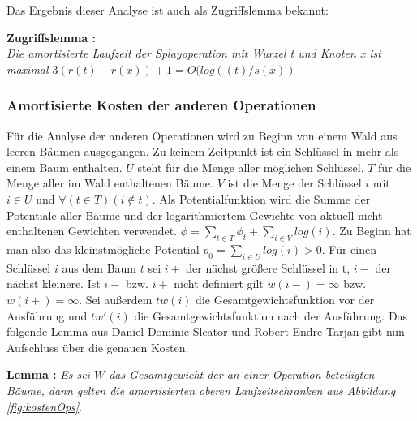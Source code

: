 \documentclass[11pt, a4paper]{article}
\begin{document}
\noindent Das Ergebnis dieser Analyse ist auch als Zugriffslemma bekannt:

\noindent\textbf{Zugriffslemma \cite{sl2}:}\\
\textit{Die amortisierte Laufzeit der Splayoperation mit Wurzel t und Knoten x ist maximal  $3( r(t) - r(x)) + 1 = O( log(( t)/s(x))$ } 



\subsubsection{Amortisierte Kosten der anderen Operationen}
Für die Analyse der anderen Operationen wird zu Beginn von einem Wald aus leeren Bäumen ausgegangen. Zu keinem Zeitpunkt ist ein Schlüssel in mehr als einem Baum enthalten. $U$ steht für die Menge aller möglichen Schlüssel. $T$ für die Menge aller im Wald enthaltenen Bäume. $V$ ist die Menge der Schlüssel $i$ mit $i \in U$ und  	$\forall (t \in T)(i \notin t) $. Als Potentialfunktion wird die Summe der Potentiale aller Bäume und der logarithmiertem Gewichte von aktuell nicht enthaltenen Gewichten verwendet. $\phi = \sum\limits_{t \in T} \phi_{t} + \sum\limits_{i \in V} log(i) $. Zu Beginn hat man also das kleinstmögliche Potential $p_0 = \sum\limits_{i \in U} log(i) > 0$. Für einen Schlüssel $i$ aus dem Baum $t$ sei $i+$ der nächst größere Schlüssel in t, $i-$ der nächst kleinere. Ist $i-$ bzw.  $i+$ nicht definiert gilt $w(i-) = \infty$ bzw. $w(i+) = \infty$. Sei außerdem $tw(i)$ die Gesamtgewichtsfunktion vor der Ausführung und  $tw'(i)$ die Gesamtgewichtsfunktion nach der Ausführung. Das folgende Lemma aus \cite{sl2} Daniel Dominic Sleator und  Robert Endre Tarjan gibt nun Aufschluss über die genauen Kosten. 

\noindent\textbf{Lemma \cite{sl2} : }\textit{Es sei $W$ das Gesamtgewicht der an einer Operation beteiligten Bäume, dann gelten die amortisierten oberen Laufzeitschranken aus Abbildung \ref{fig:kostenOps}}. \\
\end{document}
